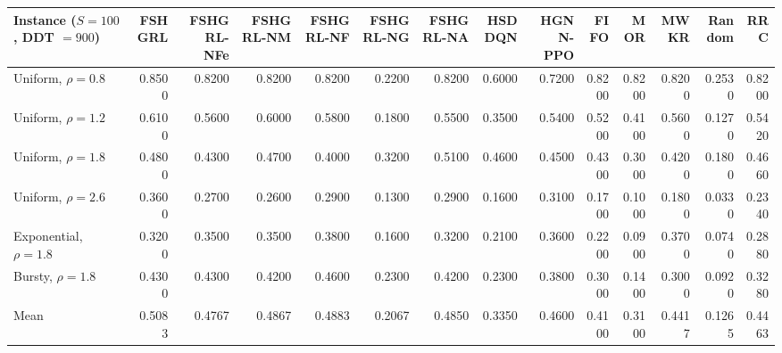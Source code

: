 \begin{tabular}{lrrrrrrrrrrrrr}
\toprule
Instance ($S = 100$, DDT $= 900$) & FSHGRL & FSHGRL-NFe & FSHGRL-NM & FSHGRL-NF & FSHGRL-NG & FSHGRL-NA & HSDDQN & HGNN-PPO & FIFO & MOR & MWKR & Random & RRC \\
\midrule
Uniform, $\rho = 0.8$ & 0.8500 & 0.8200 & 0.8200 & 0.8200 & 0.2200 & 0.8200 & 0.6000 & 0.7200 & 0.8200 & 0.8200 & 0.8200 & 0.2530 & 0.8200 \\
Uniform, $\rho = 1.2$ & 0.6100 & 0.5600 & 0.6000 & 0.5800 & 0.1800 & 0.5500 & 0.3500 & 0.5400 & 0.5200 & 0.4100 & 0.5600 & 0.1270 & 0.5420 \\
Uniform, $\rho = 1.8$ & 0.4800 & 0.4300 & 0.4700 & 0.4000 & 0.3200 & 0.5100 & 0.4600 & 0.4500 & 0.4300 & 0.3000 & 0.4200 & 0.1800 & 0.4660 \\
Uniform, $\rho = 2.6$ & 0.3600 & 0.2700 & 0.2600 & 0.2900 & 0.1300 & 0.2900 & 0.1600 & 0.3100 & 0.1700 & 0.1000 & 0.1800 & 0.0330 & 0.2340 \\
Exponential, $\rho = 1.8$ & 0.3200 & 0.3500 & 0.3500 & 0.3800 & 0.1600 & 0.3200 & 0.2100 & 0.3600 & 0.2200 & 0.0900 & 0.3700 & 0.0740 & 0.2880 \\
Bursty, $\rho = 1.8$ & 0.4300 & 0.4300 & 0.4200 & 0.4600 & 0.2300 & 0.4200 & 0.2300 & 0.3800 & 0.3000 & 0.1400 & 0.3000 & 0.0920 & 0.3280 \\
Mean & 0.5083 & 0.4767 & 0.4867 & 0.4883 & 0.2067 & 0.4850 & 0.3350 & 0.4600 & 0.4100 & 0.3100 & 0.4417 & 0.1265 & 0.4463 \\
\bottomrule
\end{tabular}
